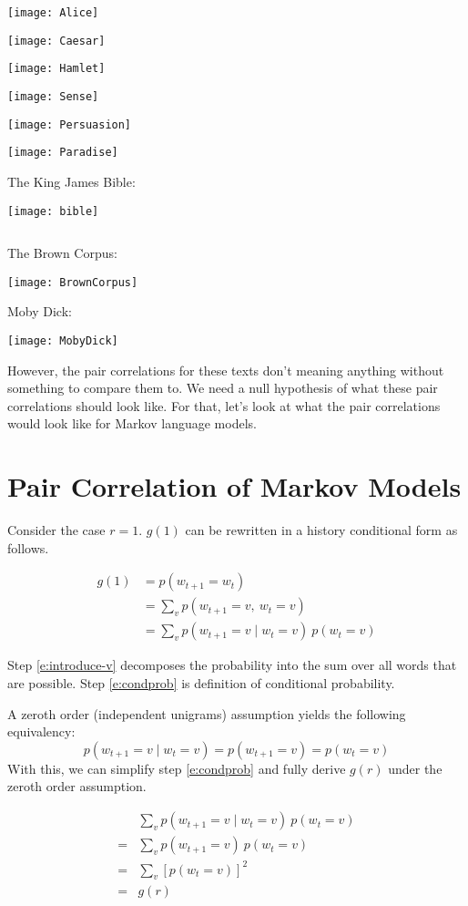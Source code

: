 \documentclass[11pt,letterpaper]{article}
\theoremstyle{definition}
\begin{document}
\texttt{[image: Alice]}

\texttt{[image: Caesar]}

\texttt{[image: Hamlet]}

\texttt{[image: Sense]}

\texttt{[image: Persuasion]}

\texttt{[image: Paradise]}

The King James Bible:

\texttt{[image: bible]}

\[\]
\[\]

The Brown Corpus:

\texttt{[image: BrownCorpus]}

Moby Dick:

\texttt{[image: MobyDick]}

However, the pair correlations for these texts don't meaning anything without something to compare them to. We need a null hypothesis of what these pair correlations should look like. For that, let's look at what the pair correlations would look like for Markov language models. 

\section{Pair Correlation of Markov Models}

Consider the case $r=1$.  $g(1)$ can be rewritten in a history conditional form as follows.

\begin{align}
g(1) &= p(w_{t+1}=w_{t}) \\
&= \sum_v p(w_{t+1}=v,\ w_{t}=v)  \label{e:introduce-v} \\
&= \sum_v p(w_{t+1}=v \mid w_t=v)\ p(w_t = v) \label{e:condprob}
\end{align}

Step \ref{e:introduce-v} decomposes the probability into the sum over all words that are possible.  Step \ref{e:condprob} is definition of conditional probability.


A zeroth order (independent unigrams) assumption yields the following equivalency:
\[p(w_{t+1}=v \mid w_t=v) = p(w_{t+1}=v) = p(w_{t}=v)\]
With this, we can simplify step \ref{e:condprob} and fully derive $g(r)$ under the zeroth order assumption.

\begin{align}
&\sum_v p(w_{t+1}=v \mid w_t=v)\ p(w_t=v) \\
= &\sum_v p(w_{t+1}=v)\ p(w_t=v)\\
= &\sum_v [p(w_{t}=v)]^2  \\
= &g(r) 
\end{align}
\end{document}
